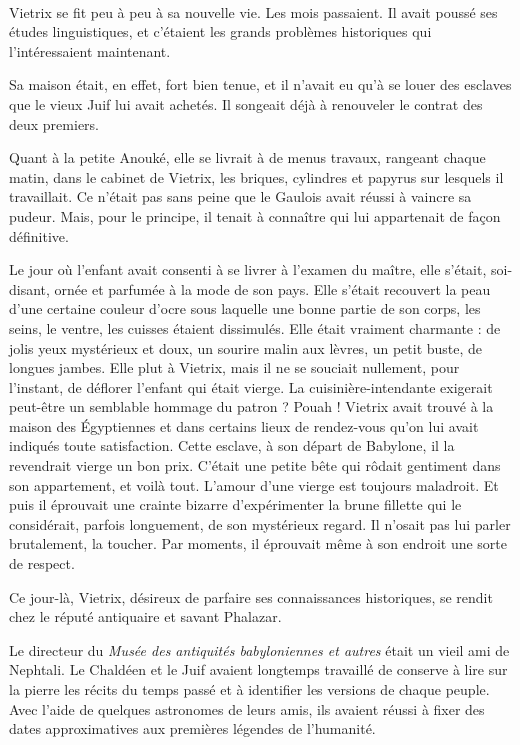 \documentclass[a4paper, 11pt, oneside, polutonikogreek, french]{article}
\begin{document}
\paragraph{}
Vietrix se fit peu à peu à sa nouvelle vie. Les mois passaient. Il avait poussé ses études linguistiques, et c'étaient les grands problèmes historiques qui l'intéressaient maintenant.

Sa maison était, en effet, fort bien tenue, et il n'avait eu qu'à se louer des esclaves que le vieux Juif lui avait achetés. Il songeait déjà à renouveler le contrat des deux premiers.

Quant à la petite Anouké, elle se livrait à de menus travaux, rangeant chaque matin, dans le cabinet de Vietrix, les briques, cylindres et papyrus sur lesquels il travaillait. Ce n'était pas sans peine que le Gaulois avait réussi à vaincre sa pudeur. Mais, pour le principe, il tenait à connaître qui lui appartenait de façon définitive.

Le jour où l'enfant avait consenti à se livrer à l'examen du maître, elle s'était, soi-disant, ornée et parfumée à la mode de son pays. Elle s'était recouvert la peau d'une certaine couleur d'ocre sous laquelle une bonne partie de son corps, les seins, le ventre, les cuisses étaient dissimulés. Elle était vraiment charmante : de jolis yeux mystérieux et doux, un sourire malin aux lèvres, un petit buste, de longues jambes. Elle plut à Vietrix, mais il ne se souciait nullement, pour l'instant, de déflorer l'enfant qui était vierge. La cuisinière-intendante exigerait peut-être un semblable hommage du patron ? Pouah ! Vietrix avait trouvé à la maison des Égyptiennes et dans certains lieux de rendez-vous qu'on lui avait indiqués toute satisfaction. Cette esclave, à son départ de Babylone, il la revendrait vierge un bon prix. C'était une petite bête qui rôdait gentiment dans son appartement, et voilà tout. L'amour d'une vierge est toujours maladroit. Et puis il éprouvait une crainte bizarre d'expérimenter la brune fillette qui le considérait, parfois longuement, de son mystérieux regard. Il n'osait pas lui parler brutalement, la toucher. Par moments, il éprouvait même à son endroit une sorte de respect.

Ce jour-là, Vietrix, désireux de parfaire ses connaissances historiques, se rendit chez le réputé antiquaire et savant Phalazar.

\bigskip
\centerline{\EightStarTaper}
\centerline{\EightStarTaper\EightStarTaper}
\bigskip

Le directeur du \emph{Musée des antiquités babyloniennes et autres} était un vieil ami de Nephtali. Le Chaldéen et le Juif avaient longtemps travaillé de conserve à lire sur la pierre les récits du temps passé et à identifier les versions de chaque peuple. Avec l'aide de quelques astronomes de leurs amis, ils avaient réussi à fixer des dates approximatives aux premières légendes de l'humanité.
\end{document}

